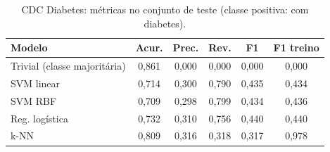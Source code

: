 \begin{table}[!t]
\centering
\caption{CDC Diabetes: métricas no conjunto de teste (classe positiva: com diabetes).}
\label{tab:cdc_metricas}
\begin{tabular}{lccccc}
\hline
Modelo & Acur. & Prec. & Rev. & F1 & F1 treino \\
\hline
Trivial (classe majoritária) & 0,861 & 0,000 & 0,000 & 0,000 & 0,000 \\
SVM linear & 0,714 & 0,300 & 0,790 & 0,435 & 0,434 \\
SVM RBF & 0,709 & 0,298 & 0,799 & 0,434 & 0,436 \\
Reg. logística & 0,732 & 0,310 & 0,756 & 0,440 & 0,440 \\
k-NN & 0,809 & 0,316 & 0,318 & 0,317 & 0,978 \\
\hline
\end{tabular}
\end{table}
